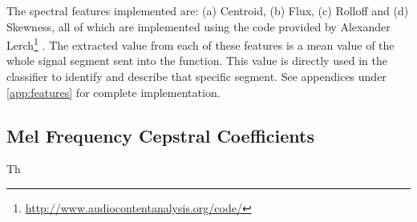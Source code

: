 The spectral features implemented are: (a) Centroid, (b) Flux, (c) Rolloff and (d) Skewness, all of which are implemented using the code provided by Alexander Lerch\footnote{\url{http://www.audiocontentanalysis.org/code/}} \citep{ACA}. The extracted value from each of these features is a mean value of the whole signal segment sent into the function. This value is directly used in the classifier to identify and describe that specific segment. See appendices under \ref{app:features} for complete implementation.

\subsection{Mel Frequency Cepstral Coefficients}
Th